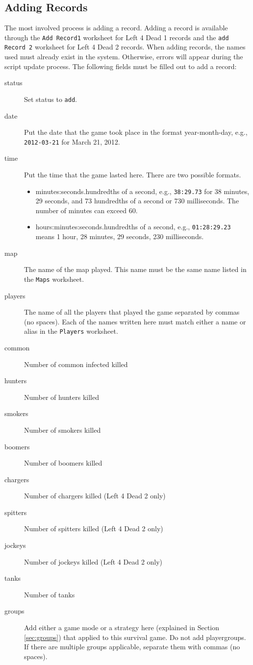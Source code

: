 \subsection{Adding Records}
The most involved process is adding a record. Adding a record is available through the \texttt{Add Record1} worksheet for Left 4 Dead 1 records and the \texttt{add Record 2} worksheet for Left 4 Dead 2 records. When adding records, the names used must already exist in the system. Otherwise, errors will appear during the script update process. The following fields must be filled out to add a record:
\begin{description}
\item[status] Set status to \texttt{add}.
\item[date] Put the date that the game took place in the format year-month-day, e.g., \texttt{2012-03-21} for March 21, 2012.
\item[time] Put the time that the game lasted here. There are two possible formats.
	\begin{itemize}
	\item minutes:seconds.hundredths of a second, e.g., \texttt{38:29.73} for 38 minutes, 29 seconds, and 73 hundredths of a second or 730 milliseconds. The number of minutes can exceed 60.
	\item hours:minutes:seconds.hundredths of a second, e.g., \texttt{01:28:29.23} means 1 hour, 28 minutes, 29 seconds, 230 milliseconds.
	\end{itemize}
\item[map] The name of the map played. This name must be the same name listed in the \texttt{Maps} worksheet.
\item[players] The name of all the players that played the game separated by commas (no spaces). Each of the names written here must match either a name or alias in the \texttt{Players} worksheet.
\item[common] Number of common infected killed
\item[hunters] Number of hunters killed
\item[smokers] Number of smokers killed
\item[boomers] Number of boomers killed
\item[chargers] Number of chargers killed (Left 4 Dead 2 only)
\item[spitters] Number of spitters killed (Left 4 Dead 2 only)
\item[jockeys] Number of jockeys killed (Left 4 Dead 2 only)
\item[tanks] Number of tanks
\item[groups] Add either a game mode or a strategy here (explained in Section \ref{sec:groups}) that applied to this survival game. Do not add playergroups. If there are multiple groups applicable, separate them with commas (no spaces).
\end{description}

